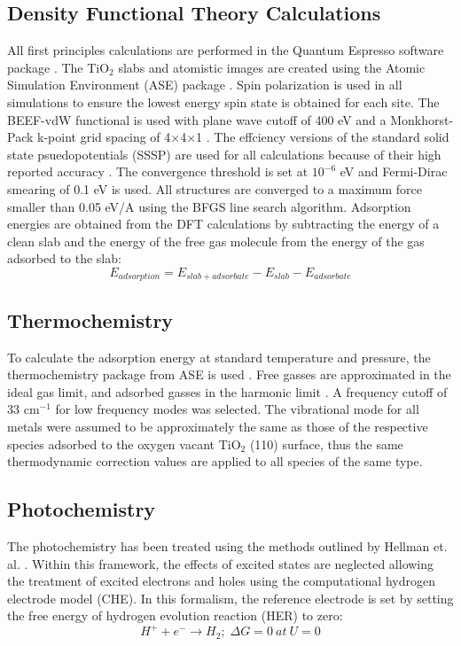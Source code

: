 \subsection{Density Functional Theory Calculations}
All first principles calculations are performed in the Quantum Espresso software package \cite{QE-2009}.
The TiO$_2$ slabs and atomistic images are created using the Atomic Simulation Environment (ASE) package \cite{Hjorth_Larsen_2017}.  Spin polarization is used in all simulations to ensure the lowest energy spin state is obtained for each site. The BEEF-vdW functional \cite{Wellendorff_2012} is used with plane wave cutoff of 400 eV and a Monkhorst-Pack k-point grid spacing of 4$\times$4$\times$1 \cite{Monkhorst_1976}. The effciency versions of the standard solid state psuedopotentials \cite{SSSP_pseudos} (SSSP) are used for all calculations because of their high reported accuracy \cite{Lejaeghereaad3000}. The convergence threshold is set at $10^{-6}$ eV and Fermi-Dirac smearing of 0.1 eV is used. All structures are converged to a maximum force smaller than 0.05 eV/A using the BFGS line search algorithm. Adsorption energies are obtained from the DFT calculations by subtracting the energy of a clean slab and the energy of the free gas molecule from the energy of the gas adsorbed to the slab:
\begin{equation}
E_{adsorption} = E_{slab+adsorbate} - E_{slab} - E_{adsorbate}
\end{equation}

\subsection{Thermochemistry}

To calculate the adsorption energy at standard temperature and pressure, the thermochemistry package from ASE is used \cite{ase-paper}. Free gasses are approximated in the ideal gas limit, and adsorbed gasses in the harmonic limit \cite{Reuter_2005}. A frequency cutoff of 33 cm$^{-1}$ for low frequency modes was selected. The vibrational mode for all metals were assumed to be approximately the same as those of the respective species adsorbed to the oxygen vacant TiO$_2$ (110) surface, thus the same thermodynamic correction values are applied to all species of the same type.

\subsection{Photochemistry}
\label{sec:PEC_methods}
The photochemistry has been treated using the methods outlined by Hellman et. al. \cite{Hellman2017}. Within this framework, the effects of excited states are neglected allowing the treatment of excited electrons and holes using the computational hydrogen electrode model (CHE). In this formalism, the reference electrode is set by setting the free energy of hydrogen evolution reaction (HER) to zero:
\begin{equation}
    H^+ + e^- \rightarrow H_2;\; \Delta G = 0\:at\: U = 0
\end{equation}

